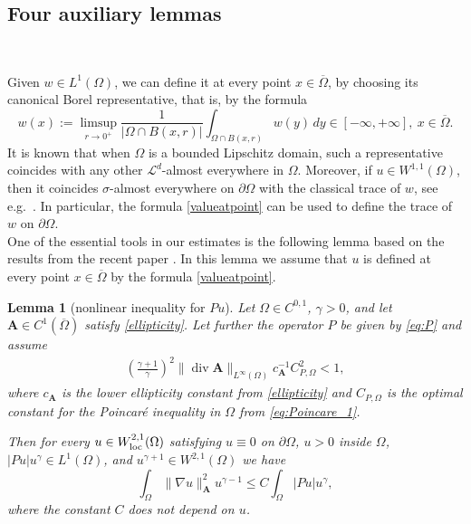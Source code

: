 \documentclass[12pt,a4paper]{amsart}
\newtheorem{lemma}[theorem]{\bf Lemma}
\theoremstyle{definition}
\newcommand{\A}{\mathbf{A}}
\begin{document}
\subsection{Four auxiliary lemmas}\label{sec:lemmas}\

 Given  $w\in L^1(\Omega)$, we can define it at every point $x\in \overline{\Omega}$, by choosing its canonical Borel representative, that is, 
 by the formula
\begin{equation}\label{valueatpoint}
w(x):=\limsup_{r\to 0^+} \frac{1}{|\Omega\cap B(x,r)|}\int_{\Omega\cap B(x,r)} w(y)\, dy \in [-\infty,+\infty], \ x\in \overline{\Omega}.
\end{equation}
It is known that when $\Omega$ is a bounded Lipschitz domain, such a representative coincides with any other ${\mathcal L}^d$-almost everywhere in $\Omega$. Moreover, if $u\in W^{1,1}(\Omega)$, then it coincides $\sigma$-almost everywhere on $\partial\Omega$ with the classical trace of $w$, see e.g.~\cite{MR555952}. In particular, the formula \eqref{valueatpoint} can be used to define the trace of $w$ on $\partial\Omega$.\\

One of the essential tools in our estimates is the following lemma based on the results from the recent paper \cite{MR4948792}. In this lemma we assume that $u$ is defined at every point $x\in \overline{\Omega}$ by the formula \eqref{valueatpoint}.

\begin{lemma}[nonlinear inequality for $Pu$]\label{lemm:KPR_estimate}
    Let $\Omega\in C^{0,1}$, $\gamma>0$, and let $\A\in C^1(\overline{\Omega})$ satisfy \eqref{ellipticity}. Let further the operator $P$ be given by \eqref{eq:P} and assume
    \begin{align}\label{eq:KPR_assumption}
        \left( \frac{\gamma + 1}{ \gamma} \right)^2 \lVert \operatorname{div} \A \rVert_{L^\infty(\Omega)}c_{\A}^{-1} C_{P,\Omega}^2 <1, 
    \end{align}
    where 
    $c_{\A}$ is the lower ellipticity constant from \eqref{ellipticity} and $C_{P,\Omega}$ is the optimal constant for the Poincar\'e inequality in $\Omega$ from \eqref{eq:Poincare_1}. 
    
    Then for every $u \in W_{\rm loc}^{2, 1}(\Omega)$ satisfying $u \equiv 0$ on $\partial \Omega$, $u>0$  inside $\Omega$, $\lvert Pu \rvert u^{\gamma} \in L^1(\Omega)$, and $u^{\gamma + 1} \in W^{2, 1}(\Omega)$ we have
    \begin{equation*}
        \int_\Omega \|\nabla u\|_\A^2 u^{\gamma -1} \le C \int_\Omega \lvert Pu \rvert u^\gamma ,
    \end{equation*}
    where the constant $C$ does not depend on $u$.
\end{lemma}
\end{document}
